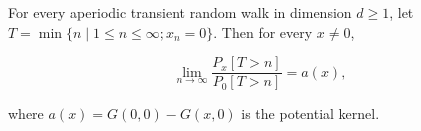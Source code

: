 For every aperiodic transient random walk in dimension $d \geq 1$, let $T = \min\{n \mid 1 \leq n \leq \infty; x_n = 0\}$. Then for every $x \neq 0$,

$$\lim_{n \to \infty} \frac{P_x[T > n]}{P_0[T > n]} = a(x),$$

where $a(x) = G(0,0) - G(x,0)$ is the potential kernel.
